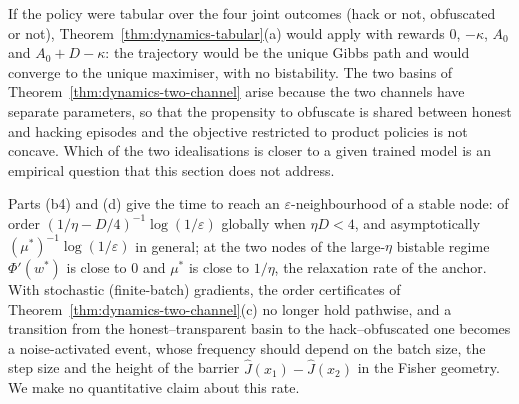 \begin{remark}
\label{rem:mean-field}
If the policy were tabular over the four joint outcomes (hack or not,
obfuscated or not), Theorem~\ref{thm:dynamics-tabular}(a) would apply with
rewards $0$, $-\kappa$, $A_0$ and $A_0+D-\kappa$: the trajectory would be
the unique Gibbs path and would converge to the unique maximiser, with no
bistability. The two basins of Theorem~\ref{thm:dynamics-two-channel}
arise because the two channels have separate parameters, so that the
propensity to obfuscate is shared between honest and hacking episodes and
the objective restricted to product policies is not concave. Which of the
two idealisations is closer to a given trained model is an empirical
question that this section does not address.
\end{remark}

\begin{remark}\label{rem:noise}
Parts (b4) and (d) give the time to reach an $\varepsilon$-neighbourhood of
a stable node: of order $(1/\eta-D/4)^{-1}\log(1/\varepsilon)$ globally
when $\eta D<4$, and asymptotically $(\mu^\ast)^{-1}\log(1/\varepsilon)$ in
general; at the two nodes of the large-$\eta$ bistable regime
$\Phi'(w^\ast)$ is close to $0$ and $\mu^\ast$ is close to $1/\eta$, the
relaxation rate of the anchor. With stochastic (finite-batch) gradients,
the order certificates of Theorem~\ref{thm:dynamics-two-channel}(c) no
longer hold pathwise, and a transition from the honest--transparent basin
to the hack--obfuscated one becomes a noise-activated event, whose
frequency should depend on the batch size, the step size and the height
of the barrier $\hat J(x_1)-\hat J(x_2)$ in the Fisher geometry. We make no
quantitative claim about this rate.
\end{remark}

